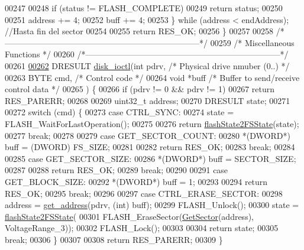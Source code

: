 \begin{DoxyCode}
00247 
00248     \textcolor{keywordflow}{if} (status != FLASH\_COMPLETE)
00249       \textcolor{keywordflow}{return} status;
00250 
00251     address += 4;
00252     buff += 4;
00253   \} \textcolor{keywordflow}{while} (address < endAddress); \textcolor{comment}{//Hasta fin del sector}
00254 
00255   \textcolor{keywordflow}{return} RES\_OK;
00256 \}
00257 
00258 \textcolor{comment}{/*-----------------------------------------------------------------------*/}
00259 \textcolor{comment}{/* Miscellaneous Functions                                               */}
00260 \textcolor{comment}{/*-----------------------------------------------------------------------*/}
00261 
\hypertarget{diskio_8c_source_l00262}{}\hyperlink{diskio_8h_a816bffc54e390c15d03f477133707de5}{00262} DRESULT \hyperlink{diskio_8c_a816bffc54e390c15d03f477133707de5}{disk\_ioctl}(\textcolor{keywordtype}{int} pdrv, \textcolor{comment}{/* Physical drive nmuber (0..) */}
00263 BYTE cmd, \textcolor{comment}{/* Control code */}
00264 \textcolor{keywordtype}{void} *buff \textcolor{comment}{/* Buffer to send/receive control data */}
00265 ) \{
00266   \textcolor{keywordflow}{if} (pdrv != 0 && pdrv != 1)
00267     \textcolor{keywordflow}{return} RES\_PARERR;
00268 
00269   uint32\_t address;
00270   DRESULT state;
00271 
00272   \textcolor{keywordflow}{switch} (cmd) \{
00273   \textcolor{keywordflow}{case} CTRL\_SYNC:
00274     state = FLASH\_WaitForLastOperation();
00275 
00276     \textcolor{keywordflow}{return} \hyperlink{diskio_8c_a3dfe0827b5e2a3a79da131b076adedff}{flashState2FSState}(state);
00277     \textcolor{keywordflow}{break};
00278 
00279   \textcolor{keywordflow}{case} GET\_SECTOR\_COUNT:
00280     *(DWORD*) buff = (DWORD) FS\_SIZE;
00281 
00282     \textcolor{keywordflow}{return} RES\_OK;
00283     \textcolor{keywordflow}{break};
00284 
00285   \textcolor{keywordflow}{case} GET\_SECTOR\_SIZE:
00286     *(DWORD*) buff = SECTOR\_SIZE;
00287 
00288     \textcolor{keywordflow}{return} RES\_OK;
00289     \textcolor{keywordflow}{break};
00290 
00291   \textcolor{keywordflow}{case} GET\_BLOCK\_SIZE:
00292     *(DWORD*) buff = 1;
00293 
00294     \textcolor{keywordflow}{return} RES\_OK;
00295     \textcolor{keywordflow}{break};
00296 
00297   \textcolor{keywordflow}{case} CTRL\_ERASE\_SECTOR:
00298     address = \hyperlink{diskio_8c_a713082e3e5375e658a941a3cca667aed}{get\_address}(pdrv, (\textcolor{keywordtype}{int}) buff);
00299     FLASH\_Unlock();
00300     state = \hyperlink{diskio_8c_a3dfe0827b5e2a3a79da131b076adedff}{flashState2FSState}(
00301         FLASH\_EraseSector(\hyperlink{diskio_8c_a90db73e2ffb962de6891c783f62db0d0}{GetSector}(address), VoltageRange\_3));
00302     FLASH\_Lock();
00303 
00304     \textcolor{keywordflow}{return} state;
00305     \textcolor{keywordflow}{break};
00306   \}
00307 
00308   \textcolor{keywordflow}{return} RES\_PARERR;
00309 \}
\end{DoxyCode}

